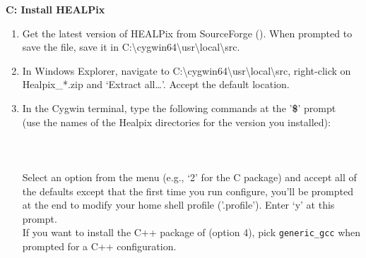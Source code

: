 \documentclass[12pt,twoside]{article}
\begin{document}
\textbf{C: Install HEALPix}
\begin{enumerate}
	\setlength{\itemsep}{-1pt}
	\setlength{\parsep}{-10pt}
\item
  Get the latest version of HEALPix from SourceForge
  (). When
  prompted to save the file, save it in
  C:\textbackslash{}cygwin64\textbackslash{}usr\textbackslash{}local\textbackslash{}src.
\item
  In Windows Explorer, navigate to
  C:\textbackslash{}cygwin64\textbackslash{}usr\textbackslash{}local\textbackslash{}src,
  right-click on Healpix\_*.zip and `Extract all\ldots{}'. Accept the
  default location.
\item
  In the Cygwin terminal, type the following commands at the
  '\textbf{\$}' prompt\\ (use the names of the Healpix directories for
  the version you installed):\\ 
	\\ 
	\\ 
	\\ 
	Select an option from the menu (e.g., `2' for the C
  package) and accept all of the defaults except that
  the first time
  you run configure, you'll be prompted at the end to modify your
  home shell profile ('.profile'). Enter `y' at this prompt.\\
  If you want to install the C++ package of \healpix (option 4), pick \texttt{generic\_gcc} when prompted for a C++ configuration.\\
  	\\ 
	\\ 
\end{enumerate}
\end{document}
